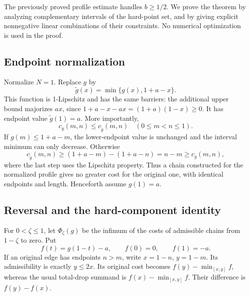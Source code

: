 The previously proved profile estimate handles \(b\ge1/2\). We prove
the theorem by analyzing complementary intervals of the hard-point set,
and by giving explicit nonnegative linear combinations of their constraints.
No numerical optimization is used in the proof.

\subsection{Endpoint normalization}
\label{hardgap:normalization}

Normalize \(N=1\). Replace \(g\) by
\[
 \widetilde g(x)=\min\{g(x),1+a-x\}.
\]
This function is 1-Lipschitz and has the same barriers: the additional
upper bound majorizes \(ax\), since
\(1+a-x-ax=(1+a)(1-x)\ge0\). It has endpoint value
\(\widetilde g(1)=a\). More importantly,
\begin{equation}\label{hardgap:clip}
 c_g(m,n)\le c_{\widetilde g}(m,n)
 \quad(0\le m<n\le1).
\end{equation}
If \(g(m)\le1+a-m\), the lower-endpoint value is unchanged and
the interval minimum can only decrease. Otherwise
\[
 c_{\widetilde g}(m,n)
 \ge(1+a-m)-(1+a-n)=n-m\ge c_g(m,n),
\]
where the last step uses the Lipschitz property. Thus a chain constructed
for the normalized profile gives no greater cost for the original one,
with identical endpoints and length. Henceforth assume \(g(1)=a\).

\subsection{Reversal and the hard-component identity}
\label{hardgap:identity-section}

For \(0<\zeta\le1\), let \(\Phi_\zeta(g)\) be the infimum of
the costs of admissible chains from \(1-\zeta\) to zero. Put
\[
 f(t)=g(1-t)-a,\qquad f(0)=0,\qquad f(1)=-a.
\]
If an original edge has endpoints \(n>m\), write
\(x=1-n\), \(y=1-m\). Its admissibility is exactly
\(y\le2x\). Its original cost becomes
\(f(y)-\min_{[x,y]}f\), whereas the usual total-drop summand is
\(f(x)-\min_{[x,y]}f\). Their difference is \(f(y)-f(x)\).

